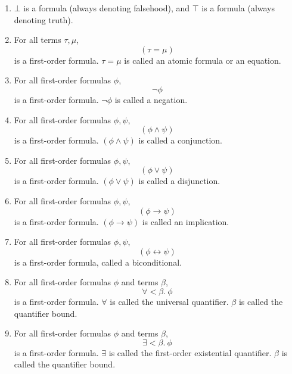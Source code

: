 \documentclass[11pt]{article}
\begin{document}
\begin{enumerate}
	\item $\bot$ is a formula (always denoting falsehood), and $\top$ is a formula (always denoting truth).
	\item For all terms $\tau, \mu$,
		\begin{equation}
			(\tau = \mu)
		\end{equation}
		is a first-order formula. $\tau = \mu$ is called an atomic formula or an equation.
	\item For all first-order formulas $\phi$,
		\begin{equation}
			\neg\phi
		\end{equation}
		is a first-order formula. $\neg\phi$ is called a negation.
	\item For all first-order formulas $\phi, \psi$, 
		\begin{equation}
			(\phi \wedge \psi)
		\end{equation}
		is a first-order formula. $(\phi \wedge \psi)$ is called a conjunction.
	\item For all first-order formulas $\phi, \psi$,
		\begin{equation}
			(\phi \vee \psi)
		\end{equation}
		is a first-order formula. $(\phi \vee \psi)$ is called a disjunction.
	\item For all first-order formulas $\phi, \psi$,
		\begin{equation}
			(\phi \to \psi)
		\end{equation}
		is a first-order formula. $(\phi \to \psi)$ is called an implication.
	\item For all first-order formulas $\phi, \psi$,
		\begin{equation}
			(\phi \leftrightarrow \psi)
		\end{equation}
		is a first-order formula, called a biconditional.
	\item For all first-order formulas $\phi$ and terms $\beta$,
		\begin{equation}
			\forall < \beta.\ \phi
		\end{equation}
		is a first-order formula. $\forall$ is called the universal quantifier. $\beta$ is called the quantifier bound.
	\item For all first-order formulas $\phi$ and terms $\beta$,
		\begin{equation}
			\exists < \beta.\ \phi
		\end{equation}
		is a first-order formula. $\exists$ is called the first-order existential quantifier. $\beta$ is called the quantifier bound.
\end{enumerate}
\end{document}
